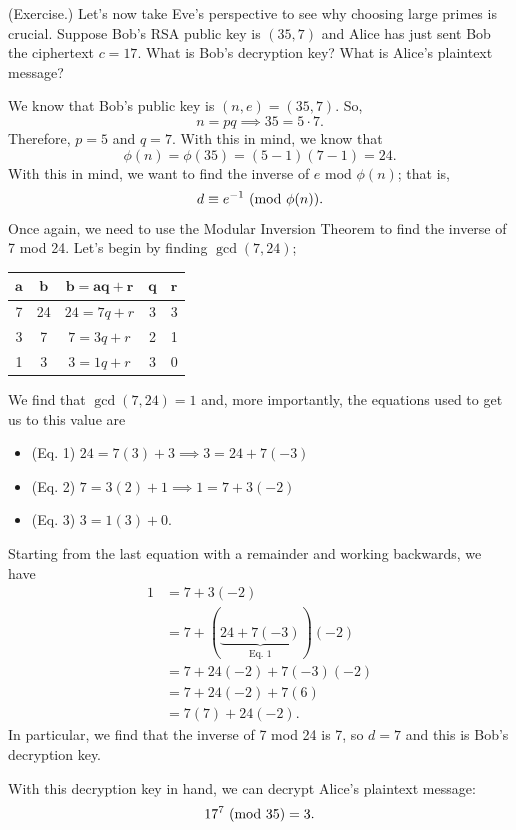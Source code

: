 \documentclass[letterpaper]{article}
\begin{document}
\begin{mdframed}
    (Exercise.) Let's now take Eve's perspective to see why choosing large primes is crucial. Suppose Bob's RSA public key is $(35, 7)$ and Alice has just sent Bob the ciphertext $c = 17$. What is Bob's decryption key? What is Alice's plaintext message? 

    \begin{mdframed}
        We know that Bob's public key is $(n, e) = (35, 7)$. So, \[n = pq \implies 35 = 5 \cdot 7.\] Therefore, $p = 5$ and $q = 7$. With this in mind, we know that \[\phi(n) = \phi(35) = (5 - 1)(7 - 1) = 24.\] With this in mind, we want to find the inverse of $e$ mod $\phi(n)$; that is, \[d \equiv e^{-1} \ (\mathrm{mod}\ \phi(n)).\] Once again, we need to use the Modular Inversion Theorem to find the inverse of 7 mod 24. Let's begin by finding $\gcd(7, 24)$; 
        \begin{center}
            \begin{tabular}{|c|c|c|c|c|}
                \hline 
                $\mathbf{a}$ & $\mathbf{b}$ & $\mathbf{b = aq + r}$ & $\mathbf{q}$ & $\mathbf{r}$ \\ 
                \hline 
                7 & 24 & $24 = 7q + r$ & 3 & 3 \\ 
                3 & 7 & $7 = 3q + r$ & 2 & 1 \\ 
                1 & 3 & $3 = 1q + r$ & 3 & 0 \\ 
                \hline 
            \end{tabular}
        \end{center}
        We find that $\gcd(7, 24) = 1$ and, more importantly, the equations used to get us to this value are 
        \begin{itemize}
            \item (Eq. 1) $24 = 7(3) + 3 \implies 3 = 24 + 7(-3)$
            \item (Eq. 2) $7 = 3(2) + 1 \implies 1 = 7 + 3(-2)$
            \item (Eq. 3) $3 = 1(3) + 0$.
        \end{itemize}
        Starting from the last equation with a remainder and working backwards, we have 
        \begin{equation*}
            \begin{aligned}
                1 &= 7 + 3(-2) \\ 
                    &= 7 + (\underbrace{24 + 7(-3)}_{\text{Eq. 1}})(-2) \\ 
                    &= 7 + 24(-2) + 7(-3)(-2) \\ 
                    &= 7 + 24(-2) + 7(6) \\ 
                    &= 7(7) + 24(-2).
            \end{aligned}
        \end{equation*}
        In particular, we find that the inverse of 7 mod 24 is 7, so $d = 7$ and this is Bob's decryption key. 

        \bigskip 

        With this decryption key in hand, we can decrypt Alice's plaintext message: 
        \[17^7 \ (\mathrm{mod}\ 35) = 3.\]
    \end{mdframed}
\end{mdframed}
\end{document}
